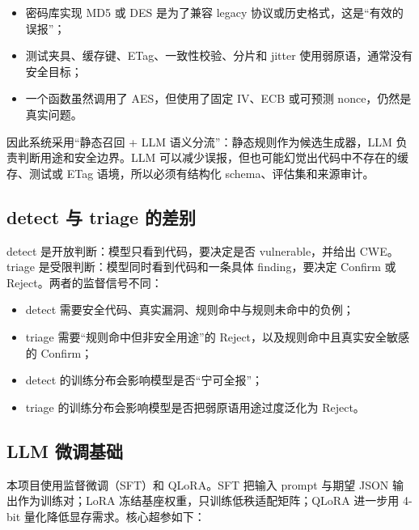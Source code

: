 \documentclass[UTF8,11pt,fontset=none]{ctexart}
\begin{document}
\begin{itemize}
  \item 密码库实现 MD5 或 DES 是为了兼容 legacy 协议或历史格式，这是“有效的误报”；
  \item 测试夹具、缓存键、ETag、一致性校验、分片和 jitter 使用弱原语，通常没有安全目标；
  \item 一个函数虽然调用了 AES，但使用了固定 IV、ECB 或可预测 nonce，仍然是真实问题。
\end{itemize}

因此系统采用“静态召回 + LLM 语义分流”：静态规则作为候选生成器，LLM 负责判断用途和安全边界。LLM 可以减少误报，但也可能幻觉出代码中不存在的缓存、测试或 ETag 语境，所以必须有结构化 schema、评估集和来源审计。

\subsection{detect 与 triage 的差别}

detect 是开放判断：模型只看到代码，要决定是否 vulnerable，并给出 CWE。triage 是受限判断：模型同时看到代码和一条具体 finding，要决定 Confirm 或 Reject。两者的监督信号不同：

\begin{itemize}
  \item detect 需要安全代码、真实漏洞、规则命中与规则未命中的负例；
  \item triage 需要“规则命中但非安全用途”的 Reject，以及规则命中且真实安全敏感的 Confirm；
  \item detect 的训练分布会影响模型是否“宁可全报”；
  \item triage 的训练分布会影响模型是否把弱原语用途过度泛化为 Reject。
\end{itemize}

\subsection{LLM 微调基础}

本项目使用监督微调（SFT）和 QLoRA。SFT 把输入 prompt 与期望 JSON 输出作为训练对；LoRA 冻结基座权重，只训练低秩适配矩阵；QLoRA 进一步用 4-bit 量化降低显存需求。核心超参如下：
\end{document}
